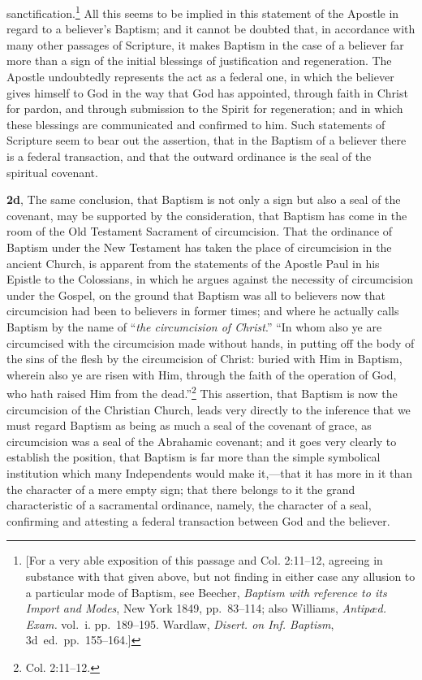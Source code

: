 \documentclass[
  english,
]{book}
\begin{document}
sanctification.\footnote{{[}For a very able exposition of this passage and Col. 2:11--12, agreeing in substance with that given above, but not finding in either case any allusion to a particular mode of Baptism, see Beecher, \emph{Baptism with reference to its Import and Modes}, New York 1849, pp.~83--114; also Williams, \emph{Antipæd. Exam.} vol.~i. pp.~189--195. Wardlaw, \emph{Disert. on Inf. Baptism}, 3d~ed.~pp.~155--164.{]}} All this seems to be implied in this statement of the Apostle in regard to a believer's Baptism; and it cannot be doubted that, in accordance with many other passages of Scripture, it makes Baptism in the case of a believer far more than a sign of the initial blessings of justification and regeneration. The Apostle undoubtedly represents the act as a federal one, in which the believer gives himself to God in the way that God has appointed, through faith in Christ for pardon, and through submission to the Spirit for regeneration; and in which these blessings are communicated and confirmed to him. Such statements of Scripture seem to bear out the assertion, that in the Baptism of a believer there is a federal transaction, and that the outward ordinance is the seal of the spiritual covenant.

\textbf{2d}, The same conclusion, that Baptism is not only a sign but also a seal of the covenant, may be supported by the consideration, that Baptism has come in the room of the Old Testament Sacrament of circumcision. That the ordinance of Baptism under the New Testament has taken the place of circumcision in the ancient Church, is apparent from the statements of the Apostle Paul in his Epistle to the Colossians, in which he argues against the necessity of circumcision under the Gospel, on the ground that Baptism was all to believers now that circumcision had been to believers in former times; and where he actually calls Baptism by the name of ``\emph{the circumcision of Christ}.'' ``In whom also ye are circumcised with the circumcision made without hands, in putting off the body of the sins of the flesh by the circumcision of Christ: buried with Him in Baptism, wherein also ye are risen with Him, through the faith of the operation of God, who hath raised Him from the dead.''\footnote{Col. 2:11--12.} This assertion, that Baptism is now the circumcision of the Christian Church, leads very directly to the inference that we must regard Baptism as being as much a seal of the covenant of grace, as circumcision was a seal of the Abrahamic covenant; and it goes very clearly to establish the position, that Baptism is far more than the simple symbolical institution which many Independents would make it,---that it has more in it than the character of a mere empty sign; that there belongs to it the grand characteristic of a sacramental ordinance, namely, the character of a seal, confirming and attesting a federal transaction between God and the believer.
\end{document}
